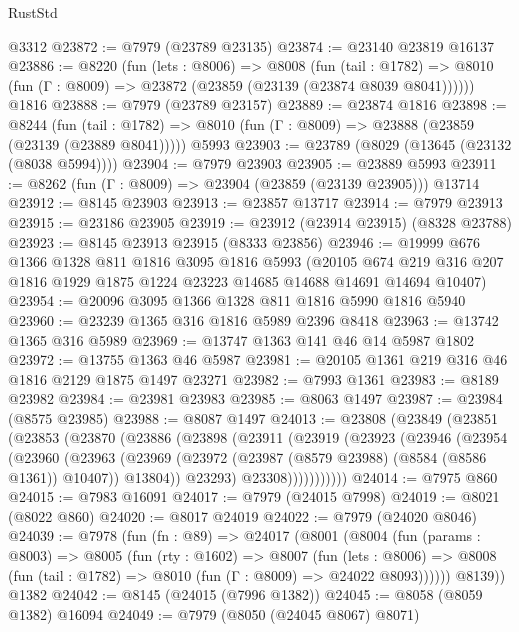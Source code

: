 \begin{lexlean}{RustStd}
\begin{coremodule}
    @3312
@23872 := @7979 (@23789 @23135)
@23874 := @23140 @23819 @16137
@23886 := @8220
    (fun (lets : @8006) =>
    @8008
      (fun (tail : @1782) =>
      @8010 (fun (Γ : @8009) => @23872 (@23859 (@23139 (@23874 @8039 @8041))))))
    @1816
@23888 := @7979 (@23789 @23157)
@23889 := @23874 @1816
@23898 := @8244
    (fun (tail : @1782) => @8010 (fun (Γ : @8009) => @23888 (@23859 (@23139 (@23889 @8041)))))
    @5993
@23903 := @23789 (@8029 (@13645 (@23132 (@8038 @5994))))
@23904 := @7979 @23903
@23905 := @23889 @5993
@23911 := @8262 (fun (Γ : @8009) => @23904 (@23859 (@23139 @23905))) @13714
@23912 := @8145 @23903
@23913 := @23857 @13717
@23914 := @7979 @23913
@23915 := @23186 @23905
@23919 := @23912 (@23914 @23915) (@8328 @23788)
@23923 := @8145 @23913 @23915 (@8333 @23856)
@23946 := @19999
    @676
    @1366
    @1328
    @811
    @1816
    @3095
    @1816
    @5993
    (@20105 @674 @219 @316 @207 @1816 @1929 @1875 @1224 @23223 @14685 @14688 @14691 @14694 @10407)
@23954 := @20096 @3095 @1366 @1328 @811 @1816 @5990 @1816 @5940
@23960 := @23239 @1365 @316 @1816 @5989 @2396 @8418
@23963 := @13742 @1365 @316 @5989
@23969 := @13747 @1363 @141 @46 @14 @5987 @1802
@23972 := @13755 @1363 @46 @5987
@23981 := @20105 @1361 @219 @316 @46 @1816 @2129 @1875 @1497 @23271
@23982 := @7993 @1361
@23983 := @8189 @23982
@23984 := @23981 @23983
@23985 := @8063 @1497
@23987 := @23984 (@8575 @23985)
@23988 := @8087 @1497
@24013 := @23808
    (@23849
      (@23851
        (@23853
          (@23870
            (@23886
              (@23898
                (@23911
                  (@23919
                    (@23923
                      (@23946
                        (@23954
                          (@23960
                            (@23963
                              (@23969
                                (@23972 (@23987 (@8579 @23988) (@8584 (@8586 @1361)) @10407))
                                @13804))
                            @23293)
                          @23308)))))))))))
@24014 := @7975 @860
@24015 := @7983 @16091
@24017 := @7979 (@24015 @7998)
@24019 := @8021 (@8022 @860)
@24020 := @8017 @24019
@24022 := @7979 (@24020 @8046)
@24039 := @7978
    (fun (fn : @89) =>
    @24017
      (@8001
        (@8004
          (fun (params : @8003) =>
          @8005
            (fun (rty : @1602) =>
            @8007
              (fun (lets : @8006) =>
              @8008 (fun (tail : @1782) => @8010 (fun (Γ : @8009) => @24022 @8093))))))
        @8139))
    @1382
@24042 := @8145 (@24015 (@7996 @1382))
@24045 := @8058 (@8059 @1382) @16094
@24049 := @7979 (@8050 (@24045 @8067) @8071)

\end{coremodule}
\end{lexlean}
